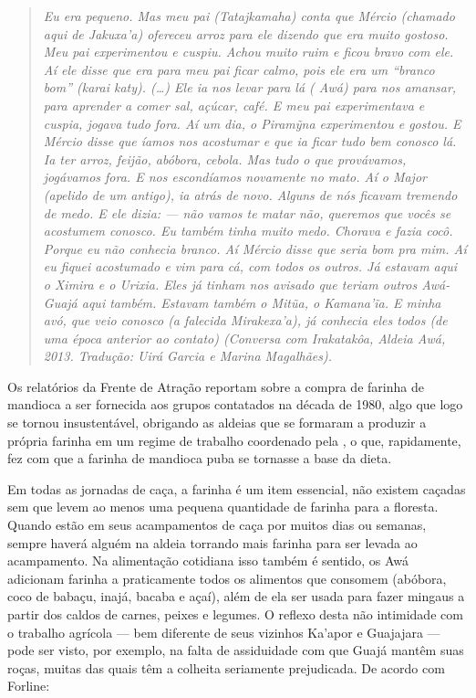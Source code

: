 \begin{quote}
\emph{Eu era pequeno. Mas meu pai (Tatajkamaha) conta que Mércio
(chamado aqui de Jakuxa'a) ofereceu arroz para ele dizendo que era muito
gostoso. Meu pai experimentou e cuspiu. Achou muito ruim e ficou bravo
com ele. Aí ele disse que era para meu pai ficar calmo, pois ele era um
``branco bom'' (karai katy). (\ldots{}) Ele ia nos levar para lá ( Awá)
para nos amansar, para aprender a comer sal, açúcar, café. E meu pai
experimentava e cuspia, jogava tudo fora. Aí um dia, o Piramỹna
experimentou e gostou. E Mércio disse que íamos nos acostumar e que ia
ficar tudo bem conosco lá. Ia ter arroz, feijão, abóbora, cebola. Mas
tudo o que provávamos, jogávamos fora. E nos escondíamos novamente no
mato. Aí o Major (apelido de um antigo), ia atrás de novo. Alguns de nós
ficavam tremendo de medo. E ele dizia: --- não vamos te matar não,
queremos que vocês se acostumem conosco. Eu também tinha muito medo.
Chorava e fazia cocô. Porque eu não conhecia branco. Aí Mércio disse que
seria bom pra mim. Aí eu fiquei acostumado e vim para cá, com todos os
outros. Já estavam aqui o Ximira e o Urixia. Eles já tinham nos avisado
que teriam outros Awá-Guajá aqui também. Estavam também o Mitũa, o
Kamana'ĩa. E minha avó, que veio conosco (a falecida Mirakexa'a), já
conhecia eles todos (de uma época anterior ao contato) (Conversa com
Irakatakôa, Aldeia Awá, 2013. Tradução: Uirá Garcia e Marina Magalhães).}
\end{quote}

Os relatórios da Frente de Atração reportam sobre a compra de farinha de
mandioca a ser fornecida aos grupos contatados na década de 1980, algo
que logo se tornou insustentável, obrigando as aldeias que se formaram a
produzir a própria farinha em um regime de trabalho coordenado pela
, o que, rapidamente, fez com que a farinha de mandioca puba se
tornasse a base da dieta.

Em todas as jornadas de caça, a farinha é um item essencial, não existem
caçadas sem que levem ao menos uma pequena quantidade de farinha para a
floresta. Quando estão em seus acampamentos de caça por muitos dias ou
semanas, sempre haverá alguém na aldeia torrando mais farinha para ser
levada ao acampamento. Na alimentação cotidiana isso também é sentido,
os Awá adicionam farinha a praticamente todos os alimentos que consomem
(abóbora, coco de babaçu, inajá, bacaba e açaí), além de ela ser usada
para fazer mingaus a partir dos caldos de carnes, peixes e legumes. O
reflexo desta não intimidade com o trabalho agrícola --- bem diferente de
seus vizinhos Ka'apor e Guajajara --- pode ser visto, por exemplo, na
falta de assiduidade com que Guajá mantêm suas roças, muitas das quais
têm a colheita seriamente prejudicada. De acordo com Forline:

